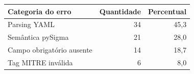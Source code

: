 \begin{tabular}{lrr}
\toprule
Categoria do erro & Quantidade & Percentual \\
\midrule
Parsing YAML & 34 & 45,3 \\
Semântica pySigma & 21 & 28,0 \\
Campo obrigatório ausente & 14 & 18,7 \\
Tag MITRE inválida & 6 & 8,0 \\
\bottomrule
\end{tabular}
